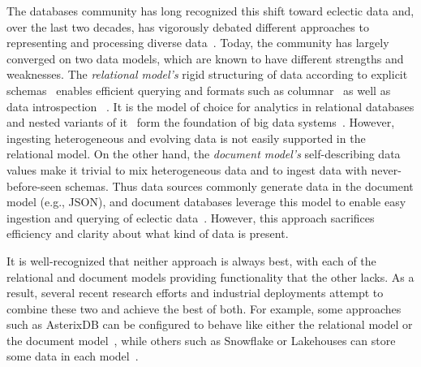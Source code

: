 The databases community has long recognized this shift toward eclectic data and, over the last two decades, has vigorously debated different approaches to representing and processing diverse data~. Today, the community has largely converged on two data models, which are known to have different strengths and weaknesses. The {\em relational model's} rigid structuring of data according to explicit schemas~ enables efficient querying and formats such as columnar~ as well as data introspection~\cite{aurum} . It is the model of choice for analytics in relational databases and nested variants of it~\cite{avro, parquet, dremel} form the foundation of big data systems~\cite{spark, hadoop, delta_lake}. However, ingesting heterogeneous and evolving data is not easily supported in the relational model. On the other hand, the {\em document model's} self-describing data values make it trivial to mix heterogeneous data and to ingest data with never-before-seen schemas. Thus data sources commonly generate data in the document model (e.g., JSON), and document databases leverage this model to enable easy ingestion and querying of eclectic data~\cite{mongo, couchbase}. However, this approach sacrifices efficiency and clarity about what kind of data is present. 

It is well-recognized that neither approach is always best, with each of the relational and document models providing functionality that the other lacks. As a result, several recent research efforts and industrial deployments attempt to combine these two and achieve the best of both. For example, some approaches such as AsterixDB can be configured to behave like either the relational model or the document model~\cite{asterixdb, sql++}, while others such as Snowflake or Lakehouses can store some data in each model~\cite{snowflake, postgres, bigdawg, dbms+, delta_lake, lakehouse}.

